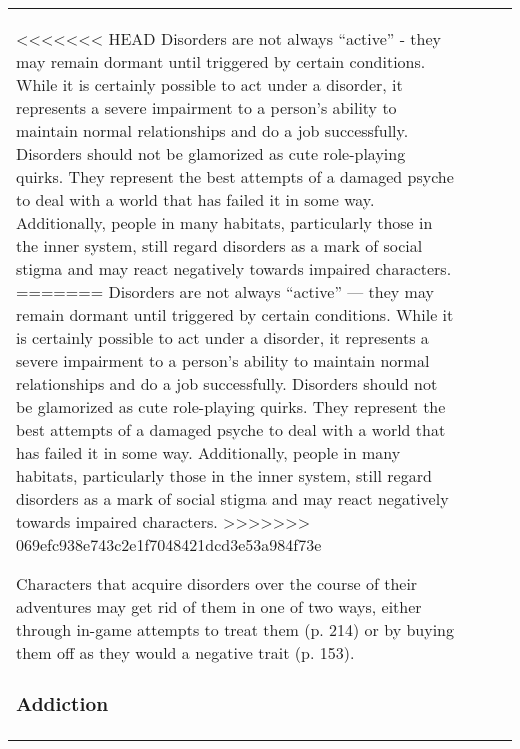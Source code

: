 \begin{table}
\begin{tabular}{|p{8cm}|r|r|r|}
<<<<<<< HEAD Disorders are not always ``active” - they may remain dormant until triggered by certain conditions. While it is certainly possible to act under a disorder, it represents a severe impairment to a person’s ability to maintain normal relationships and do a job successfully. Disorders should not be glamorized as cute role-playing quirks. They represent the best attempts of a damaged psyche to deal with a world that has failed it in some way. Additionally, people in many habitats, particularly those in the inner system, still regard disorders as a mark of social stigma and may react negatively towards impaired characters. ======= Disorders are not always ``active'' --- they may remain dormant until triggered by certain conditions. While it is certainly possible to act under a disorder, it represents a severe impairment to a person’s ability to maintain normal relationships and do a job successfully. Disorders should not be glamorized as cute role-playing quirks. They represent the best attempts of a damaged psyche to deal with a world that has failed it in some way. Additionally, people in many habitats, particularly those in the inner system, still regard disorders as a mark of social stigma and may react negatively towards impaired characters. >>>>>>> 069efc938e743c2e1f7048421dcd3e53a984f73e 

Characters that acquire disorders over the course of their adventures may get rid of them in one of two ways, either through in-game attempts to treat them (p. 214) or by buying them off as they would a negative trait (p. 153). 

\subsubsection{Addiction} 


\end{tabular}
\end{table}
